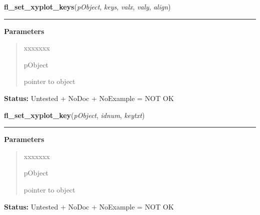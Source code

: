 \hspace{.8\funcindent}\begin{boxedminipage}{\funcwidth}

    \raggedright \textbf{fl\_set\_xyplot\_keys}(\textit{pObject}, \textit{keys}, \textit{valx}, \textit{valy}, \textit{align})

    \vspace{-1.5ex}

    \rule{\textwidth}{0.5\fboxrule}
\setlength{\parskip}{2ex}
\setlength{\parskip}{1ex}
      \textbf{Parameters}
      \vspace{-1ex}

      \begin{quote}
        \begin{Ventry}{xxxxxxx}

          \item[pObject]

          pointer to object

        \end{Ventry}

      \end{quote}

\textbf{Status:} Untested + NoDoc + NoExample = NOT OK



    \end{boxedminipage}

    \label{xformslib:library:fl_set_xyplot_key}

    \vspace{0.5ex}

\hspace{.8\funcindent}\begin{boxedminipage}{\funcwidth}

    \raggedright \textbf{fl\_set\_xyplot\_key}(\textit{pObject}, \textit{idnum}, \textit{keytxt})

    \vspace{-1.5ex}

    \rule{\textwidth}{0.5\fboxrule}
\setlength{\parskip}{2ex}
\setlength{\parskip}{1ex}
      \textbf{Parameters}
      \vspace{-1ex}

      \begin{quote}
        \begin{Ventry}{xxxxxxx}

          \item[pObject]

          pointer to object

        \end{Ventry}

      \end{quote}

\textbf{Status:} Untested + NoDoc + NoExample = NOT OK



    \end{boxedminipage}


